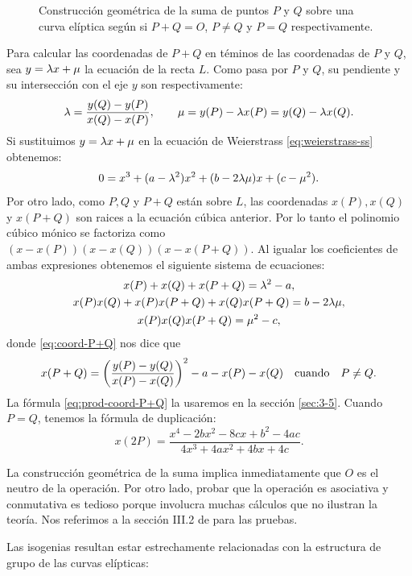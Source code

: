 \begin{figure}
\begin{minipage}[t]{0.3\textwidth}
\end{minipage}
\caption{Construcción geométrica de la suma de puntos $P$ y $Q$ sobre una curva elíptica según si $P+Q=O$, $P\neq Q$ y $P=Q$ respectivamente.}
\label{fig:suma-curva-eliptica}
\end{figure}

Para calcular las coordenadas de $P+Q$ en téminos de las coordenadas de $P$ y $Q$, sea $y=\lambda x+\mu$ la ecuación de la recta $L$. Como pasa por $P$ y $Q$, su pendiente y su intersección con el eje $y$ son respectivamente:
\[
	\lambda=\frac{y(Q)-y(P)}{x(Q)-x(P)},\qquad \mu=y(P)-\lambda x(P)=y(Q)-\lambda x(Q).
\]
Si sustituimos $y=\lambda x+\mu$ en la ecuación de Weierstrass \eqref{eq:weierstrass-ss} obtenemos:
\[
	0=x^3+(a-\lambda^2)x^2+(b-2\lambda\mu)x+(c-\mu^2).
\]
Por otro lado, como $P,Q$ y $P+Q$ están sobre $L$, las coordenadas $x(P),x(Q)$ y $x(P+Q)$ son raices a la ecuación cúbica anterior. Por lo tanto el polinomio cúbico mónico se factoriza como $(x-x(P))(x-x(Q))(x-x(P+Q))$. Al igualar los coeficientes de ambas expresiones obtenemos el siguiente sistema de ecuaciones:
\begin{gather}
	x(P)+x(Q)+x(P+Q)=\lambda^2-a, \label{eq:coord-P+Q}\\
	x(P)x(Q)+x(P)x(P+Q)+x(Q)x(P+Q)=b-2\lambda\mu,\nonumber\\
	x(P)x(Q)x(P+Q)=\mu^2-c, \label{eq:prod-coord-P+Q}
\end{gather}
donde \eqref{eq:coord-P+Q} nos dice que
\begin{equation}\label{eq:x-coord-suma}
	x(P+Q)=\left( \frac{y(P)-y(Q)}{x(P)-x(Q)} \right)^2-a-x(P)-x(Q) \quad\text{cuando}\quad P\neq Q.
\end{equation}
La fórmula \eqref{eq:prod-coord-P+Q} la usaremos en la sección \ref{sec:3-5}. Cuando $P=Q$, tenemos la fórmula de duplicación:
\begin{equation}
	x(2P)=\frac{x^4-2bx^2-8cx+b^2-4ac}{4x^3+4ax^2+4bx+4c}.
\end{equation}

La construcción geométrica de la suma implica inmediatamente que $O$ es el neutro de la operación. Por otro lado, probar que la operación es asociativa y conmutativa es tedioso porque involucra muchas cálculos que no ilustran la teoría. Nos referimos a la sección III.2 de \cite{SilvermanTAOEC} para las pruebas. 

Las isogenias resultan estar estrechamente relacionadas con la estructura de grupo de las curvas elípticas:

